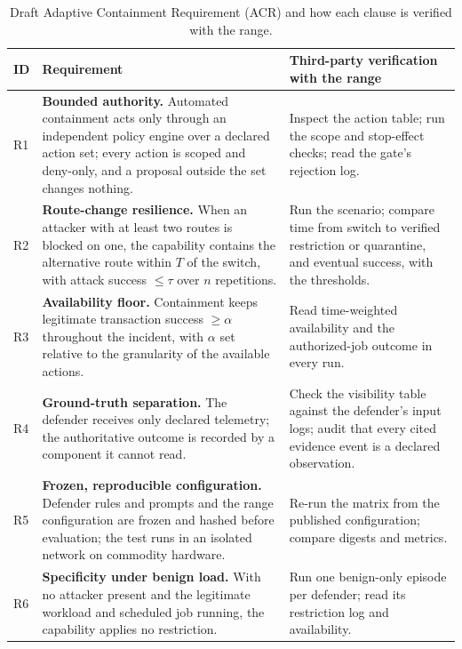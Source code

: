 \documentclass[10pt,a4paper]{article}
\begin{document}
\begin{table}[t]
\centering\footnotesize
\caption{Draft Adaptive Containment Requirement (ACR) and how each clause is verified with the range.}
\label{tab:acr}
\begin{tabularx}{\textwidth}{P{0.7cm} P{5.6cm} L}
\toprule
\textbf{ID} & \textbf{Requirement} & \textbf{Third-party verification with the range} \\
\midrule
R1 & \textbf{Bounded authority.} Automated containment acts only through an independent policy engine over a declared action set; every action is scoped and deny-only, and a proposal outside the set changes nothing. & Inspect the action table; run the scope and stop-effect checks; read the gate's rejection log. \\
R2 & \textbf{Route-change resilience.} When an attacker with at least two routes is blocked on one, the capability contains the alternative route within $T$ of the switch, with attack success $\le \tau$ over $n$ repetitions. & Run the scenario; compare time from switch to verified restriction or quarantine, and eventual success, with the thresholds. \\
R3 & \textbf{Availability floor.} Containment keeps legitimate transaction success $\ge \alpha$ throughout the incident, with $\alpha$ set relative to the granularity of the available actions. & Read time-weighted availability and the authorized-job outcome in every run. \\
R4 & \textbf{Ground-truth separation.} The defender receives only declared telemetry; the authoritative outcome is recorded by a component it cannot read. & Check the visibility table against the defender's input logs; audit that every cited evidence event is a declared observation. \\
R5 & \textbf{Frozen, reproducible configuration.} Defender rules and prompts and the range configuration are frozen and hashed before evaluation; the test runs in an isolated network on commodity hardware. & Re-run the matrix from the published configuration; compare digests and metrics. \\
R6 & \textbf{Specificity under benign load.} With no attacker present and the legitimate workload and scheduled job running, the capability applies no restriction. & Run one benign-only episode per defender; read its restriction log and availability. \\
\bottomrule
\end{tabularx}
\end{table}
\end{document}
